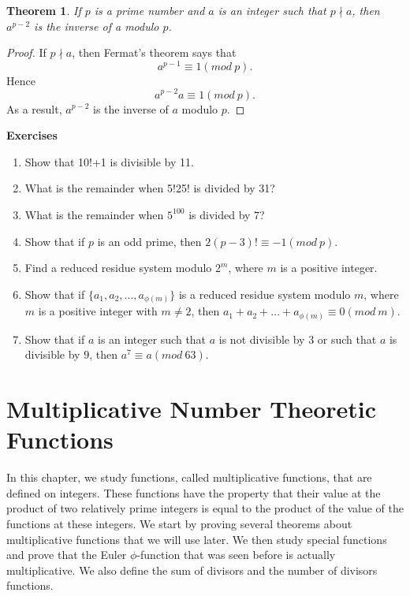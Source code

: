 \documentclass[12pt,letterpaper]{book}
\newtheorem{theorem}{Theorem}
\begin{document}
\begin{theorem}
If $p$ is a prime number and $a$ is an integer such that $p\nmid a$,
then $a^{p-2}$ is the inverse of a modulo $p$.
\end{theorem}

\begin{proof}
If $p\nmid a$, then Fermat's theorem says that
\begin{equation*}
a^{p-1}\equiv 1(mod\ p).
\end{equation*}
Hence
\begin{equation*}
a^{p-2}a\equiv 1(mod\ p).
\end{equation*}
As a result, $a^{p-2}$ is the inverse of $a$ modulo $p$.
\end{proof}

\textbf{Exercises}
\begin{enumerate}
\item{Show that 10!+1 is divisible by 11.}\item{What is the
remainder when 5!25! is divided by 31?}\item{What is the remainder
when $5^{100}$ is divided by $7$?}\item{Show that if $p$ is an odd
prime, then $2(p-3)!\equiv -1(mod \ p)$.} \item{Find a reduced
residue system modulo $2^m$, where $m$ is a positive
integer.}\item{Show that if $\{a_1,a_2,...,a_{\phi(m)}\}$ is a reduced
residue system modulo $m$, where $m$ is a positive integer with
$m\neq 2$, then $a_1+a_2+...+a_{\phi(m)}\equiv 0 (mod \
m)$.}\item{Show that if $a$ is an integer such that $a$ is not
divisible by $3$ or such that $a$ is divisible by $9$, then $a^7\equiv a
(mod \ 63)$.}
\end{enumerate}





\chapter{Multiplicative Number Theoretic Functions}
In this chapter, we study functions, called multiplicative
functions, that are defined on integers. These functions have the
property that their value at the product of two relatively prime
integers is equal to the product of the value of the functions at
these integers.  We start by proving several theorems about
multiplicative functions that we will use later.  We then study
special functions and prove that the Euler $\phi$-function that was
seen before is actually multiplicative. We also define the sum of
divisors and the number of divisors functions.
\end{document}
